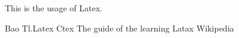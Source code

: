 \documentclass{article}
\begin{document}
This is the usage\cite{bibitem2,bibitem3,bibitem4} of Latex\cite{bibitem1}.

\begin{thebibliography}{3}
Bao Tl.Latex
Ctex
The guide of the learning Latax
Wikipedia
\end{thebibliography}
\end{document}
